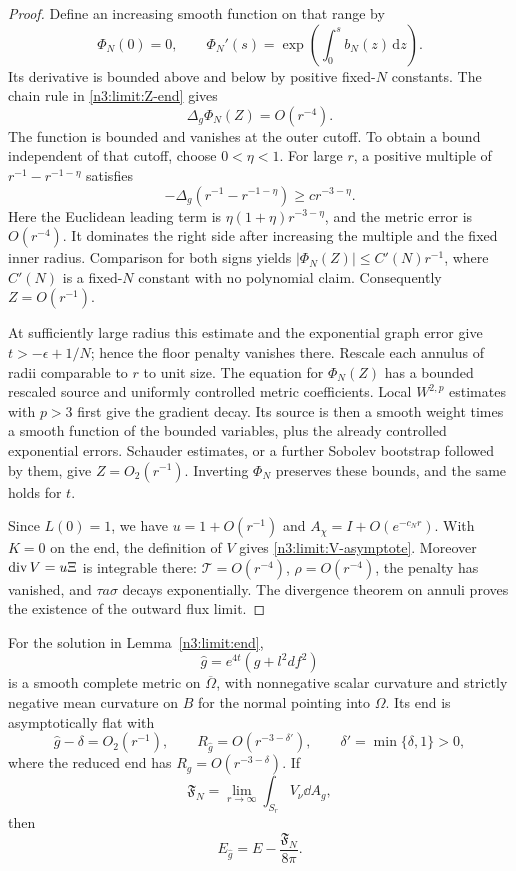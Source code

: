 \begin{proof}
Define an increasing smooth function on that range by
\[
 \Phi_N(0)=0,\qquad
 \Phi_N'(s)=\exp\!\left(\int_0^s b_N(z)\,\mathrm dz\right).
\]
Its derivative is bounded above and below by positive fixed-\(N\)
constants. The chain rule in \eqref{n3:limit:Z-end} gives
\[
                         \Delta_g\Phi_N(Z)=O(r^{-4}).
\]
The function is bounded and vanishes at the outer cutoff. To obtain
a bound independent of that cutoff, choose \(0<\eta<1\).
For large \(r\), a positive multiple of
\(r^{-1}-r^{-1-\eta}\) satisfies
\[
 -\Delta_g(r^{-1}-r^{-1-\eta})\ge c r^{-3-\eta}.
\]
Here the Euclidean leading term is
\(\eta(1+\eta)r^{-3-\eta}\), and the metric error is \(O(r^{-4})\).
It dominates the right side after increasing the multiple and the
fixed inner radius. Comparison for both signs yields
\(|\Phi_N(Z)|\le C'(N) r^{-1}\), where \(C'(N)\) is a fixed-\(N\)
constant with no polynomial claim. Consequently \(Z=O(r^{-1})\).

At sufficiently large radius this estimate and the exponential graph
error give \(t>-\epsilon+1/N\); hence the floor penalty vanishes there.
Rescale each annulus of radii comparable to \(r\) to unit size.
The equation for \(\Phi_N(Z)\) has a bounded rescaled source and
uniformly controlled metric coefficients. Local \(W^{2,p}\)
estimates with \(p>3\) first give the gradient decay. Its source is
then a smooth weight times a smooth function of the bounded variables,
plus the already controlled exponential errors. Schauder estimates,
or a further Sobolev bootstrap followed by them, give
\(Z=O_2(r^{-1})\). Inverting \(\Phi_N\) preserves these bounds, and
the same holds for \(t\).

Since \(L(0)=1\), we have \(u=1+O(r^{-1})\) and
\(A_\chi=I+O(e^{-c_N r})\). With \(K=0\) on the end, the definition
of \(V\) gives \eqref{n3:limit:V-asymptote}.
Moreover \(\operatorname{div} V=u\Xi\) is integrable there:
\(\mathcal T=O(r^{-4})\), \(\rho=O(r^{-4})\), the penalty has vanished,
and \(\tau a\sigma\) decays exponentially. The divergence theorem on
annuli proves the existence of the outward flux limit.
\end{proof}

\begin{lemma}\label{n3:limit:geometry}
For the solution in Lemma~\ref{n3:limit:end},
\[
                         \hat g=e^{4t}(g+l^2df^2)
\]
is a smooth complete metric on \(\overline\Omega\), with nonnegative
scalar curvature and strictly negative mean curvature on \(B\) for
the normal pointing into \(\Omega\).
Its end is asymptotically flat with
\[
 \hat g-\delta=O_2(r^{-1}),\qquad
 R_{\hat g}=O(r^{-3-\delta'}),\qquad
 \delta'=\min\{\delta,1\}>0,
\]
where the reduced end has \(R_g=O(r^{-3-\delta})\).
If
\[
                 \mathfrak F_N=\lim_{r\to\infty}
                    \int_{S_r}V_\nu\dd A_g,
\]
then
\begin{equation}\label{n3:limit:adm}
                         E_{\hat g}=E-\frac{\mathfrak F_N}{8\pi}.
\end{equation}
\end{lemma}

